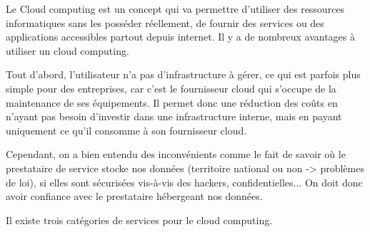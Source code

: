 \documentclass[]{article}
\begin{document}
Le Cloud computing est un concept qui va permettre d'utiliser des
ressources informatiques sans les posséder réellement, de fournir des
services ou des applications accessibles partout depuis internet. Il y a
de nombreux avantages à utiliser un cloud computing. 

Tout d'abord, l'utilisateur n'a pas d'infrastructure à gérer, ce qui est parfois plus
simple pour des entreprises, car c'est le fournisseur cloud qui s'occupe
de la maintenance de ses équipements. Il permet donc une réduction des
coûts en n'ayant pas besoin d'investir dans une infrastructure interne,
mais en payant uniquement ce qu'il consomme à son fournisseur cloud.

Cependant, on a bien entendu des inconvénients comme le fait de savoir
où le prestataire de service stocke nos données (territoire national ou
non -\textgreater{} problèmes de loi), si elles sont sécurisées vis-à-vis des hackers, confidentielles...
On doit donc avoir confiance avec le prestataire hébergeant nos données.

Il existe trois catégories de services pour le cloud computing.
\end{document}
